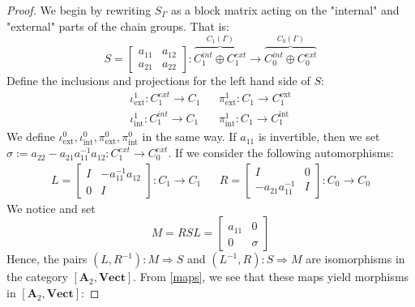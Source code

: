 \documentclass[11pt, one side, article]{memoir}
\begin{document}
\begin{proof}
    We begin by rewriting $S_\Gamma$ as a block matrix acting on the "internal" and "external" parts of the chain groups. That is:
    \begin{equation*}
    S = \begin{bmatrix}
        a_{11} & a_{12} \\
        a_{21} & a_{22}
    \end{bmatrix}
    : \overbrace{C_1^{int} \oplus C_1^{ext}}^{C_1(\Gamma)} \to \overbrace{C_0^{int} \oplus C_0^{ext}}^{C_0(\Gamma)}
    \end{equation*}
    Define the inclusions and projections for the left hand side of $S$:
    \begin{align}\label{maps}
        \iota_{\textrm{ext}}^1:C_1^{ext} \to C_1 && \pi_{\textrm{ext}}^1:C_1 \to C_1 ^{\textrm{ext}} \\
        \iota_{\textrm{int}}^1:C_1^{int} \to C_1 && \pi_{\textrm{int}}^1:C_1 \to C_1 ^{\textrm{int}}
    \end{align}
    We define $\iota_{\textrm{ext}}^0, \iota_{\textrm{int}}^0, \pi_{\textrm{ext}}^0, \pi_{\textrm{int}}^0$ in the same way.
    If $a_{11}$ is invertible, then we set $\sigma:=a_{22} -a_{21}a_{11}^{-1}a_{12} :  C_1^{ext} \to  C_0^{ext}$.
    \newline If we consider the following automorphisms:
    \begin{align*}
        L = \begin{bmatrix}
            I & -a_{11}^{-1}a_{12} \\
            0 & I
            \end{bmatrix}:C_1 \to C_1
            &&
        R = \begin{bmatrix}
            I & 0 \\
            -a_{21}a_{11}^{-1} & I
            \end{bmatrix}:C_0 \to C_0   
    \end{align*}
    We notice and set
    \begin{equation*}
        M= RSL =  \begin{bmatrix}
            a_{11} & 0 \\
            0 & \sigma
            \end{bmatrix}
    \end{equation*} 
    Hence, the pairs $(L,R^{-1}):M \Rightarrow S$ and $(L^{-1},R):S \Rightarrow M$ are isomorphisms in the category $[\mathbf{A}_2, \textbf{Vect}]$. From \eqref{maps}, we see that these maps yield morphisms in $[\mathbf{A}_2, \textbf{Vect}]$:

\end{proof}
\end{document}
